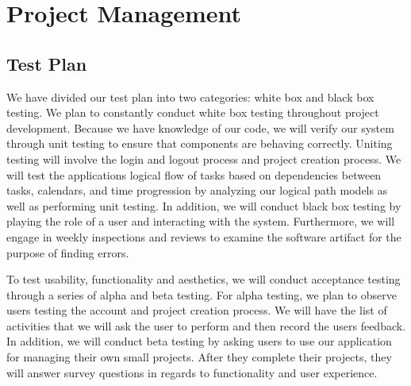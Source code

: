 \chapter{Project Management}

\section{Test Plan}
We have divided our test plan into two categories: white box and black box testing. We plan to constantly conduct white box testing throughout project development. Because we have knowledge of our code, we will verify our system through unit testing to ensure that components are behaving correctly. Uniting testing will involve the login and logout process and project creation process. We will test the application\textsc{}s logical flow of tasks based on dependencies between tasks, calendars, and time progression by analyzing our logical path models as well as performing unit testing. In addition, we will conduct black box testing by playing the role of a user and interacting with the system. Furthermore, we will engage in weekly inspections and reviews to examine the software artifact for the purpose of finding errors. \par To test usability, functionality and aesthetics, we will conduct acceptance testing through a series of alpha and beta testing. For alpha testing, we plan to observe users testing the account and project creation process. We will have the list of activities that we will ask the user to perform and then record the user\textsc{}s feedback. In addition, we will conduct beta testing by asking users to use our application for managing their own small projects. After they complete their projects, they will answer survey questions in regards to functionality and user experience.

